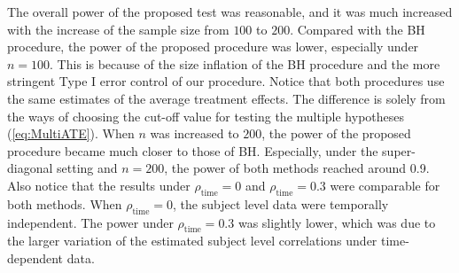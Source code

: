 \documentclass[12pt]{article}
\theoremstyle{definition}
\begin{document}

The overall power of the proposed test was reasonable, and it was much increased with the increase of the sample size from $100$ to $200$. Compared with the BH procedure, the power of the proposed procedure was lower, especially under $n = 100$. 
This is because of the size inflation of the BH procedure and the more stringent Type I error control of our procedure. Notice that both procedures use the same estimates of the average treatment effects. The difference is solely from the ways of choosing the cut-off value for testing the multiple hypotheses (\ref{eq:MultiATE}).
When $n$ was increased to $200$, the power of the proposed procedure became much closer to those of BH. Especially, under the super-diagonal setting and $n = 200$, the power of both methods reached around 0.9.
Also notice that the results under $\rho_{\mathrm{\scriptstyle time}} = 0$ and $\rho_{\mathrm{\scriptstyle time}} = 0.3$ were comparable for both methods. When $\rho_{\mathrm{\scriptstyle time}} = 0$, the subject level data were temporally independent. 
The power under $\rho_{\mathrm{\scriptstyle time}} = 0.3$ was slightly lower, which was due to the larger variation of the estimated subject level correlations under time-dependent data.  
\end{document}

